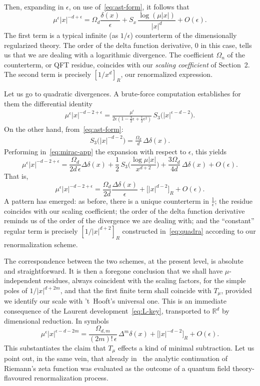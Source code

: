 \documentclass[a4paper,12pt]{article}
\newcommand{\Dl}{\Delta}           %
\newcommand{\dl}{\delta}           %
\newcommand{\eps}{\epsilon}        %
\newcommand{\R}{\mathbb{R}}        %
\newcommand{\7}{\dagger}           %
\theoremstyle{plain}
\theoremstyle{definition}
\begin{document}
Then, expanding in $\eps$, on use of~\eqref{eq:ast-form}, it follows
that
$$
\mu^\eps |x|^{-d+\eps} = \Omega_d \frac{\dl(x)}{\eps} +
S_x\,\frac{\log(\mu|x|)}{|x|^d} + O(\eps).
$$
The first term is a typical infinite (as $1/\eps$) counterterm of the
dimensionally regularized theory. The order of the delta function
derivative, 0 in this case, tells us that we are dealing with a
logarithmic divergence. The coefficient $\Omega_n$ of the counterterm,
or QFT residue, coincides with our \textit{scaling coefficient} of
Section~2. The second term is precisely $[1/x^d]_R$, our renormalized
expression.

Let us go to quadratic divergences. A brute-force computation
establishes for them the differential identity
\begin{eqnarray}
\mu^\eps |x|^{-d-2+\eps} =
\frac{\mu^\eps}{2\eps(1-\frac{3}{2}\eps+\frac{1}{2}\eps^2)}
\,S_3 \bigl(|x|^{\eps-d-2}\bigr).
\label{eq:mirac-app}
\end{eqnarray}
On the other hand, from~\eqref{eq:ast-form}:
\begin{eqnarray}
S_3\bigl(|x|^{-d-2}\bigr) = \frac{\Omega_d}{d}\,\Dl\dl(x).
\end{eqnarray}
Performing in~\eqref{eq:mirac-app} the expansion with respect to
$\eps$, this yields
$$
\mu^\eps |x|^{-d-2+\eps} = \frac{\Omega_d}{2d\,\eps} \Dl\dl(x) +
\frac{1}{2}\, S_3\biggl(\frac{\log\mu|x|}{x^{d+2}}\biggr) +
\frac{3\Omega_d}{4d}\,\Dl\dl(x) + O(\eps).
$$
That is,
$$
\mu^\eps |x|^{-d-2+\eps} = \frac{\Omega_d}{2d} \frac{\Dl\dl(x)}{\eps}
+ \bigl[|x|^{d-2}\bigr]_R + O(\eps).
$$
A pattern has emerged: as before, there is a unique counterterm in
$\frac{1}{\eps}$; the residue coincides with our scaling coefficient;
the order of the delta function derivative reminds us of the order of
the divergence we are dealing with; and the ``constant'' regular term
is precisely $[1/|x|^{d+2}]_R$ constructed in~\eqref{eq:quadra}
according to our renormalization scheme.

The correspondence between the two schemes, at the present level, is
absolute and straightforward. It is then a foregone conclusion that we
shall have $\mu$-independent residues, always coincident with the
scaling factors, for the simple poles of $1/|x|^{d+2m}$, and that the
first finite term shall coincide with $T_\mu$, provided we identify
our scale with 't~Hooft's universal one. This is an immediate
consequence of the Laurent development~\eqref{eq:L-key}, transported
to $\R^d$ by dimensional reduction. In symbols
\begin{equation}
\mu^\eps |x|^{\eps-d-2m} =
\frac{\Omega_{d,m}}{(2m)!\,\eps}\,\Dl^m\dl(x)
+ \bigl[|x|^{-d-2}\bigr]_R + O(\eps).
\label{eq:dim-par}
\end{equation}
This substantiates the claim that $T_\mu$ effects a kind of minimal
subtraction. Let us point out, in the same vein, that already
in~\cite{Odysseus} the analytic continuation of Riemann's zeta
function was evaluated as the outcome of a quantum field
theory-flavoured renormalization process.
\end{document}
